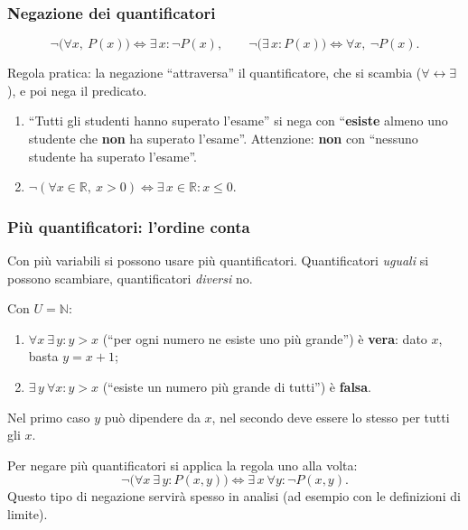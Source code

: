 \documentclass[11pt,a4paper]{article}
\begin{document}
\subsubsection{Negazione dei quantificatori}

\begin{teorema}
\[
\neg\big(\forall x,\ P(x)\big) \iff \exists\, x : \neg P(x), \qquad
\neg\big(\exists\, x : P(x)\big) \iff \forall x,\ \neg P(x).
\]
\end{teorema}

Regola pratica: la negazione ``attraversa'' il quantificatore, che si
scambia ($\forall \leftrightarrow \exists$), e poi nega il predicato.

\begin{esempio}\mbox{}
\begin{enumerate}
    \item ``Tutti gli studenti hanno superato l'esame'' si nega con
          ``\textbf{esiste} almeno uno studente che \textbf{non} ha superato
          l'esame''. Attenzione: \textbf{non} con ``nessuno studente ha
          superato l'esame''.
    \item $\neg(\forall x \in \mathbb{R},\ x > 0) \iff
          \exists\, x \in \mathbb{R} : x \leq 0$.
\end{enumerate}
\end{esempio}

\subsubsection{Più quantificatori: l'ordine conta}

Con più variabili si possono usare più quantificatori. Quantificatori
\emph{uguali} si possono scambiare, quantificatori \emph{diversi} no.

\begin{esempio}
Con $U = \mathbb{N}$:
\begin{enumerate}
    \item $\forall x\ \exists\, y : y > x$ \quad (``per ogni numero ne
          esiste uno più grande'') è \textbf{vera}: dato $x$, basta
          $y = x + 1$;
    \item $\exists\, y\ \forall x : y > x$ \quad (``esiste un numero più
          grande di tutti'') è \textbf{falsa}.
\end{enumerate}
Nel primo caso $y$ può dipendere da $x$, nel secondo deve essere lo stesso
per tutti gli $x$.
\end{esempio}

Per negare più quantificatori si applica la regola uno alla volta:
\[
\neg\big(\forall x\ \exists\, y : P(x,y)\big) \iff
\exists\, x\ \forall y : \neg P(x,y).
\]
Questo tipo di negazione servirà spesso in analisi (ad esempio con le
definizioni di limite).
\end{document}
